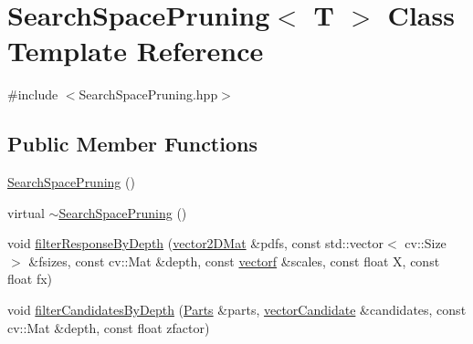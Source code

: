\hypertarget{class_search_space_pruning}{\section{Search\-Space\-Pruning$<$ T $>$ Class Template Reference}
\label{class_search_space_pruning}
}


{\ttfamily \#include $<$Search\-Space\-Pruning.\-hpp$>$}

\subsection*{Public Member Functions}
\begin{DoxyCompactItemize}
\item 
\hyperlink{class_search_space_pruning_acb47c8b784d33cbad5ffde38e689316b}{Search\-Space\-Pruning} ()
\item 
virtual \hyperlink{class_search_space_pruning_a78ec6942ec11b681a1b65faf7857af9d}{$\sim$\-Search\-Space\-Pruning} ()
\item 
void \hyperlink{class_search_space_pruning_a4f71ccfb6a90e5631467a1b5152c8fef}{filter\-Response\-By\-Depth} (\hyperlink{types_8hpp_a33cacb85be7b8df3dc0b67d5d849f4cc}{vector2\-D\-Mat} \&pdfs, const std\-::vector$<$ cv\-::\-Size $>$ \&fsizes, const cv\-::\-Mat \&depth, const \hyperlink{types_8hpp_a4da5db3ee9e284f719ef5764dbadffc8}{vectorf} \&scales, const float X, const float fx)
\item 
void \hyperlink{class_search_space_pruning_a46a0647b44efb07ffcb61558840e4ce3}{filter\-Candidates\-By\-Depth} (\hyperlink{class_parts}{Parts} \&parts, \hyperlink{types_8hpp_a04eefdf70d6c6b8effb5170271f1db05}{vector\-Candidate} \&candidates, const cv\-::\-Mat \&depth, const float zfactor)
\end{DoxyCompactItemize}


